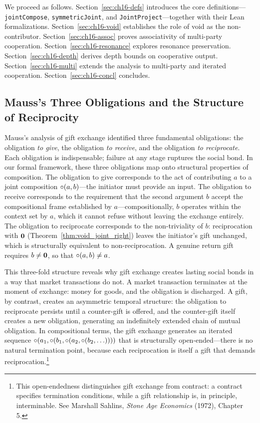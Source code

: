 We proceed as follows.  Section~\ref{sec:ch16-defs} introduces the core
definitions---\texttt{jointCompose}, \texttt{symmetricJoint}, and
\texttt{JointProject}---together with their Lean formalizations.
Section~\ref{sec:ch16-void} establishes the role of void as the
non-contributor.  Section~\ref{sec:ch16-assoc} proves associativity of
multi-party cooperation.  Section~\ref{sec:ch16-resonance} explores
resonance preservation.  Section~\ref{sec:ch16-depth} derives depth
bounds on cooperative output.  Section~\ref{sec:ch16-multi} extends the
analysis to multi-party and iterated cooperation.  Section~\ref{sec:ch16-concl}
concludes.

\subsection*{Mauss's Three Obligations and the Structure of Reciprocity}

Mauss's analysis of gift exchange identified three fundamental
obligations: the obligation \emph{to give}, the obligation \emph{to
receive}, and the obligation \emph{to reciprocate}.  Each obligation is
indispensable; failure at any stage ruptures the social bond.  In our
formal framework, these three obligations map onto structural properties
of composition.  The obligation to give corresponds to the act of
contributing $a$ to a joint composition $\circ(a, b)$---the initiator
must provide an input.  The obligation to receive corresponds to the
requirement that the second argument $b$ accept the compositional frame
established by $a$---compositionally, $b$ operates within the context
set by $a$, which it cannot refuse without leaving the exchange entirely.
The obligation to reciprocate corresponds to the non-triviality of $b$:
reciprocation with $\mathbf{0}$ (Theorem~\ref{thm:void_joint_right}) leaves
the initiator's gift unchanged, which is structurally equivalent to
non-reciprocation.  A genuine return gift requires $b \neq \mathbf{0}$, so
that $\circ(a, b) \neq a$.

This three-fold structure reveals why gift exchange creates lasting
social bonds in a way that market transactions do not.  A market
transaction terminates at the moment of exchange: money for goods, and
the obligation is discharged.  A gift, by contrast, creates an
asymmetric temporal structure: the obligation to reciprocate persists
until a counter-gift is offered, and the counter-gift itself creates a
new obligation, generating an indefinitely extended chain of mutual
obligation.  In compositional terms, the gift exchange generates an
iterated sequence $\circ(a_1, \circ(b_1, \circ(a_2,
\circ(b_2, \ldots))))$ that is structurally open-ended---there is no
natural termination point, because each reciprocation is itself a gift
that demands reciprocation.\footnote{This open-endedness distinguishes
gift exchange from contract: a contract specifies termination conditions,
while a gift relationship is, in principle, interminable.  See Marshall
Sahlins, \textit{Stone Age Economics} (1972), Chapter 5.}

